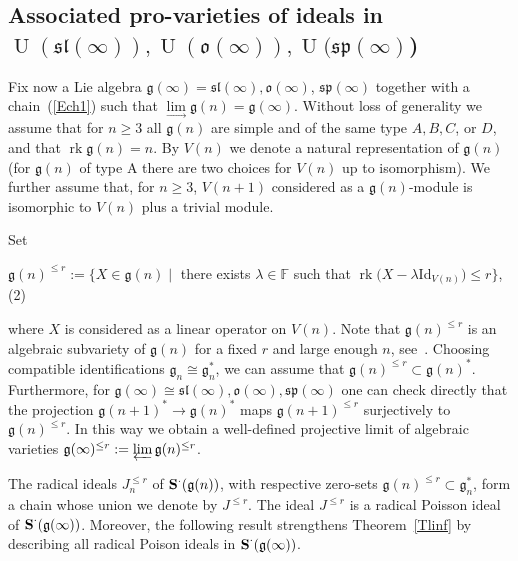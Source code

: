 \documentclass{emsprocart}
\begin{document}
\subsection{Associated pro-varieties of ideals in $\operatorname{U}(\mathfrak{sl}(\infty)), \operatorname{U}(\mathfrak o(\infty)), \operatorname{U}(\mathfrak{sp}(\infty)$)}
Fix now a Lie algebra $\mathfrak g(\infty)=\mathfrak{sl}(\infty), \mathfrak{o}(\infty)$, $\mathfrak{sp}(\infty)$ together with a chain~(\ref{Ech1}) such that $\lim\limits_{\to}\mathfrak g(n)=\mathfrak g(\infty)$. Without loss of generality we assume that for $n\ge 3$ all $\mathfrak g(n)$ are simple and of the same type $A, B, C$, or $D$, and that $\operatorname{rk}\mathfrak g(n)=n$. By $V(n)$ we denote a natural representation of $\mathfrak g(n)$ (for $\mathfrak g(n)$ of type A there are two choices for $V(n)$ up to isomorphism). We further assume that, for $n\ge 3$, $V(n+1)$ considered as a $\mathfrak g(n)$-module is isomorphic to $V(n)$ plus a trivial module.

Set
\begin{center}$\mathfrak g(n)^{\le r}:=\{X\in\mathfrak g(n)\mid$ there exists
$\lambda\in\mathbb F$ such that $\operatorname{rk} (X-\lambda$Id$_{V(n)})\le r\}$,
(2)\end{center}where $X$ is considered as a linear
operator on $V(n)$. Note that $\mathfrak g(n)^{\le r}$ is an algebraic
subvariety of $\mathfrak g(n)$ for a fixed $r$ and large enough $n$, see~\cite{PP1}. Choosing compatible identifications $\mathfrak
g_n\cong\mathfrak g_n^*$, we can assume that $\mathfrak g(n)^{\le
r}\subset\mathfrak g(n)^*$. Furthermore, for $\mathfrak
g(\infty)\cong\mathfrak{sl}(\infty), \mathfrak{o}(\infty), \mathfrak{sp}(\infty)$
one can check directly that the projection $\mathfrak g(n+1)^*\to\mathfrak
g(n)^*$ maps $\mathfrak g(n+1)^{\le r}$ surjectively to $\mathfrak
g(n)^{\le r}$. In this way we obtain a well-defined projective limit of algebraic
varieties $\mathfrak g(\infty)^{\le r}:=\varprojlim \mathfrak g(n)^{\le r}$.

The radical ideals $J_n^{\le r}$ of ${\bf S}^\cdot(\mathfrak g(n))$, with
respective zero-sets $\mathfrak g(n)^{\le r}\subset\mathfrak g_n^*$, form a
chain whose union we denote by $J^{\le r}$. The ideal $J^{\le r}$ is
a radical Poisson ideal of $\operatorname{\bf S}^\cdot(\mathfrak g(\infty))$. Moreover, the following result strengthens Theorem~\ref{Tlinf} by describing all radical Poison ideals in $\operatorname{\bf S}^\cdot(\mathfrak g(\infty))$.
\end{document}
